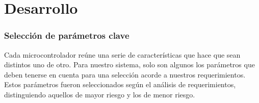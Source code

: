 
\section{Desarrollo} %
\label{it1:sec:desarrollo}


\subsubsection{Selección de parámetros clave} %
\label{ssub:seleccion_de_parametros_clave}

Cada microcontrolador reúne una serie de características que hace que sean distintos uno de otro. Para nuestro sistema, solo son algunos los parámetros que deben tenerse en cuenta para una selección acorde a nuestros requerimientos. Estos parámetros fueron seleccionados según el análisis de requerimientos, distinguiendo aquellos de mayor riesgo y los de menor riesgo. 

